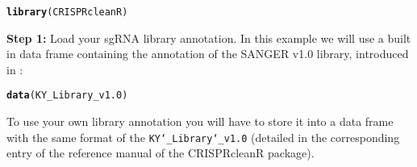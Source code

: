 \documentclass{article}\usepackage[]{graphicx}\usepackage[]{color}
\makeatletter
\newcommand{\hlstd}[1]{\textcolor[rgb]{0.345,0.345,0.345}{#1}}%
\newcommand{\hlkwd}[1]{\textcolor[rgb]{0.737,0.353,0.396}{\textbf{#1}}}%
\newenvironment{kframe}{%
 \def\at@end@of@kframe{}%
 \ifinner\ifhmode%
  \def\at@end@of@kframe{\end{minipage}}%
  \begin{minipage}{\columnwidth}%
 \fi\fi%
 \def\FrameCommand##1{\hskip\@totalleftmargin \hskip-\fboxsep
 \colorbox{shadecolor}{##1}\hskip-\fboxsep
     \hskip-\linewidth \hskip-\@totalleftmargin \hskip\columnwidth}%
 \MakeFramed {\advance\hsize-\width
   \@totalleftmargin\z@ \linewidth\hsize
   \@setminipage}}%
 {\par\unskip\endMakeFramed%
 \at@end@of@kframe}
\newenvironment{knitrout}{}{} %
\makeatother
\begin{document}
 
\begin{knitrout}
\color{fgcolor}\begin{kframe}
\begin{alltt}
    \hlkwd{library}\hlstd{(CRISPRcleanR)}
\end{alltt}


{\ttfamily\noindent\itshape\color{messagecolor}{\#\# Loading required package: stringr}}

{\ttfamily\noindent\itshape\color{messagecolor}{\#\# Loading required package: DNAcopy}}

{\ttfamily\noindent\itshape\color{messagecolor}{\#\# Loading required package: pROC}}

{\ttfamily\noindent\itshape{}}

{\ttfamily\noindent\itshape\color{messagecolor}{\#\# \\\#\# Attaching package: 'pROC'}}

{\ttfamily\noindent\itshape\color{messagecolor}{\#\# The following objects are masked from 'package:stats':\\\#\# \\\#\#\ \ \ \  cov, smooth, var}}

{\ttfamily\noindent\itshape\color{messagecolor}{\#\# Loading required package: pracma}}

{\ttfamily\noindent\itshape\color{messagecolor}{\#\# Loading required package: PRROC}}\end{kframe}
\end{knitrout}


% 
\textbf{Step 1:} Load your sgRNA library annotation. In this example we will use a built in data frame containing the annotation of the SANGER v1.0 library, introduced in \cite{Tzelepis:2016ix}:
\begin{knitrout}
\color{fgcolor}\begin{kframe}
\begin{alltt}
\hlkwd{data}\hlstd{(KY_Library_v1.0)}
\end{alltt}
\end{kframe}
\end{knitrout}
% 
To use your own library annotation you will have to store it into a data frame with the same format of the \texttt{KY\char`_Library\char`_v1.0} (detailed in the corresponding entry of the reference manual of the CRISPRcleanR package).\\
\end{document}
